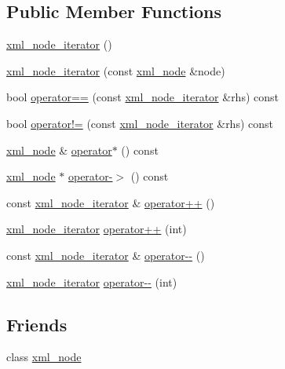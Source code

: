 \subsection*{Public Member Functions}
\begin{DoxyCompactItemize}
\item 
\hyperlink{classpugi_1_1xml__node__iterator_a683556c111ec13b41f2f98cf4d269990}{xml\-\_\-node\-\_\-iterator} ()
\item 
\hyperlink{classpugi_1_1xml__node__iterator_ae3500aff28fb786c1ea4ee33ffcb0538}{xml\-\_\-node\-\_\-iterator} (const \hyperlink{classpugi_1_1xml__node}{xml\-\_\-node} \&node)
\item 
bool \hyperlink{classpugi_1_1xml__node__iterator_a65e534c055f24987407eb3da003a8c67}{operator==} (const \hyperlink{classpugi_1_1xml__node__iterator}{xml\-\_\-node\-\_\-iterator} \&rhs) const 
\item 
bool \hyperlink{classpugi_1_1xml__node__iterator_af641f12f069707b8a66a36341ff2cc77}{operator!=} (const \hyperlink{classpugi_1_1xml__node__iterator}{xml\-\_\-node\-\_\-iterator} \&rhs) const 
\item 
\hyperlink{classpugi_1_1xml__node}{xml\-\_\-node} \& \hyperlink{classpugi_1_1xml__node__iterator_aceca81861f980f2dc1ed2153532bf2f4}{operator$\ast$} () const 
\item 
\hyperlink{classpugi_1_1xml__node}{xml\-\_\-node} $\ast$ \hyperlink{classpugi_1_1xml__node__iterator_a6cab973fe0b30de50bc5299fb33424eb}{operator-\/$>$} () const 
\item 
const \hyperlink{classpugi_1_1xml__node__iterator}{xml\-\_\-node\-\_\-iterator} \& \hyperlink{classpugi_1_1xml__node__iterator_ae61e3ce20a2d0d999241e19e695035a5}{operator++} ()
\item 
\hyperlink{classpugi_1_1xml__node__iterator}{xml\-\_\-node\-\_\-iterator} \hyperlink{classpugi_1_1xml__node__iterator_a5e8d05f7bf71bfc99b8d438dc480658c}{operator++} (int)
\item 
const \hyperlink{classpugi_1_1xml__node__iterator}{xml\-\_\-node\-\_\-iterator} \& \hyperlink{classpugi_1_1xml__node__iterator_a83ff5311f3d71c127e89a5cf6bf9d361}{operator-\/-\/} ()
\item 
\hyperlink{classpugi_1_1xml__node__iterator}{xml\-\_\-node\-\_\-iterator} \hyperlink{classpugi_1_1xml__node__iterator_a85c3618b5bb64a3e8695335e80475804}{operator-\/-\/} (int)
\end{DoxyCompactItemize}
\subsection*{Friends}
\begin{DoxyCompactItemize}
\item 
class \hyperlink{classpugi_1_1xml__node__iterator_a156d917a92815c7b593bd5ef19f6d5fb}{xml\-\_\-node}
\end{DoxyCompactItemize}


